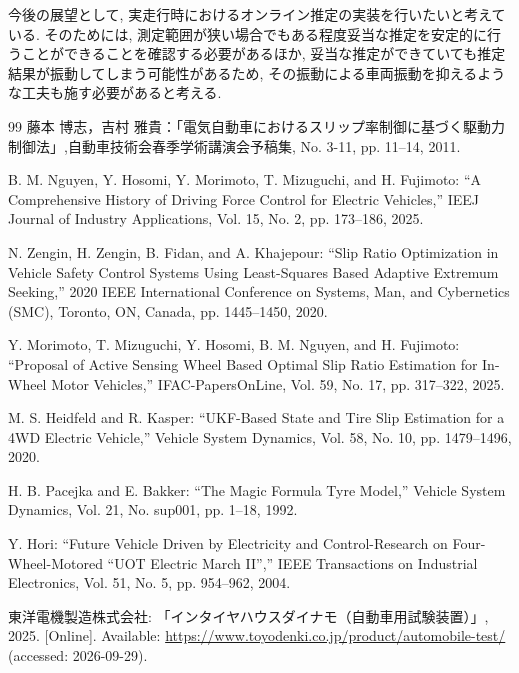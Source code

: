\documentclass[11pt,a4paper,oneside,onecolumn,fleqn,dvipdfmx]{jsarticle}
\begin{document}
今後の展望として, 実走行時におけるオンライン推定の実装を行いたいと考えている. 
そのためには, 測定範囲が狭い場合でもある程度妥当な推定を安定的に行うことができることを確認する必要があるほか, 妥当な推定ができていても推定結果が振動してしまう可能性があるため, その振動による車両振動を抑えるような工夫も施す必要があると考える. 

\clearpage
\begin{thebibliography}{99}
        藤本 博志，吉村 雅貴：「電気自動車におけるスリップ率制御に基づく駆動力制御法」,自動車技術会春季学術講演会予稿集, No. 3-11, pp. 11--14, 2011.
        
        B. M. Nguyen, Y. Hosomi, Y. Morimoto, T. Mizuguchi, and H. Fujimoto: “A Comprehensive History of Driving Force Control for Electric Vehicles,” IEEJ Journal of Industry Applications, Vol. 15, No. 2, pp. 173--186, 2025.
        
        N. Zengin, H. Zengin, B. Fidan, and A. Khajepour: “Slip Ratio Optimization in Vehicle Safety Control Systems Using Least-Squares Based Adaptive Extremum Seeking,” 2020 IEEE International Conference on Systems, Man, and Cybernetics (SMC), Toronto, ON, Canada, pp. 1445--1450, 2020.
        
        Y. Morimoto, T. Mizuguchi, Y. Hosomi, B. M. Nguyen, and H. Fujimoto: “Proposal of Active Sensing Wheel Based Optimal Slip Ratio Estimation for In-Wheel Motor Vehicles,” IFAC-PapersOnLine, Vol. 59, No. 17, pp. 317--322, 2025.
        
        M. S. Heidfeld and R. Kasper: “UKF-Based State and Tire Slip Estimation for a 4WD Electric Vehicle,” Vehicle System Dynamics, Vol. 58, No. 10, pp. 1479--1496, 2020.
        
        H. B. Pacejka and E. Bakker: “The Magic Formula Tyre Model,” Vehicle System Dynamics, Vol. 21, No. sup001, pp. 1--18, 1992.
        
        Y. Hori: “Future Vehicle Driven by Electricity and Control-Research on Four-Wheel-Motored
        “UOT Electric March II”,”
        IEEE Transactions on Industrial Electronics, Vol. 51, No. 5, pp. 954--962, 2004.


        東洋電機製造株式会社: 「インタイヤハウスダイナモ（自動車用試験装置）」, 2025. [Online]. Available: \url{https://www.toyodenki.co.jp/product/automobile-test/} (accessed: 2026-09-29).
        

\end{thebibliography}
\end{document}
